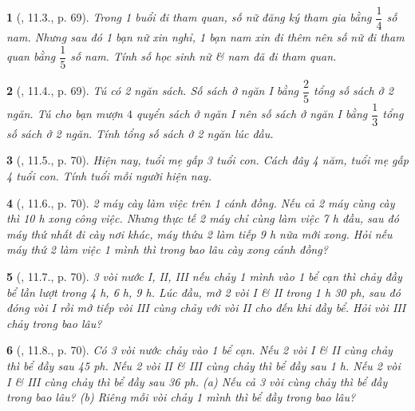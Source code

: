 \documentclass{article}
\newtheorem{baitoan}{}
\begin{document}
\begin{baitoan}[\cite{TLCT_THCS_Toan_6_so_hoc}, 11.3., p. 69]
	Trong 1 buổi đi tham quan, số nữ đăng ký tham gia bằng $\dfrac{1}{4}$ số nam. Nhưng sau đó 1 bạn nữ xin nghỉ, 1 bạn nam xin đi thêm nên số nữ đi tham quan bằng $\dfrac{1}{5}$ số nam. Tính số học sinh nữ \& nam đã đi tham quan.
\end{baitoan}

\begin{baitoan}[\cite{TLCT_THCS_Toan_6_so_hoc}, 11.4., p. 69]
	Tú có 2 ngăn sách. Số sách ở ngăn I bằng $\dfrac{2}{5}$ tổng số sách ở 2 ngăn. Tú cho bạn mượn $4$ quyển sách ở ngăn I nên số sách ở ngăn I bằng $\dfrac{1}{3}$ tổng số sách ở 2 ngăn. Tính tổng số sách ở 2 ngăn lúc đầu.
\end{baitoan}

\begin{baitoan}[\cite{TLCT_THCS_Toan_6_so_hoc}, 11.5., p. 70]
	Hiện nay, tuổi mẹ gấp 3 tuổi con. Cách đây 4 năm, tuổi mẹ gấp 4 tuổi con. Tính tuổi mỗi người hiện nay.
\end{baitoan}

\begin{baitoan}[\cite{TLCT_THCS_Toan_6_so_hoc}, 11.6., p. 70]
	2 máy cày làm việc trên 1 cánh đồng. Nếu cả 2 máy cùng cày thì {\rm10 h} xong công việc. Nhưng thực tế 2 máy chỉ cùng làm việc {\rm7 h} đầu, sau đó máy thứ nhất đi cày nơi khác, máy thứu 2 làm tiếp {\rm9 h} nữa mới xong. Hỏi nếu máy thứ 2 làm việc 1 mình thì trong bao lâu cày xong cánh đồng?
\end{baitoan}

\begin{baitoan}[\cite{TLCT_THCS_Toan_6_so_hoc}, 11.7., p. 70]
	3 vòi nước I, II, III nếu chảy 1 mình vào 1 bể cạn thì chảy đầy bể lần lượt trong {\rm4 h, 6 h, 9 h}. Lúc đầu, mở 2 vòi I \& II trong {\rm1 h 30 ph}, sau đó đóng vòi I rồi mở tiếp vòi III cùng chảy với vòi II cho đến khi đầy bể. Hỏi vòi III chảy trong bao lâu?
\end{baitoan}

\begin{baitoan}[\cite{TLCT_THCS_Toan_6_so_hoc}, 11.8., p. 70]
	Có 3 vòi nước chảy vào 1 bể cạn. Nếu 2 vòi I \& II cùng chảy thì bể đầy sau {\rm45 ph}. Nếu 2 vòi II \& III cùng chảy thì bể đầy sau {\rm1 h}. Nếu 2 vòi I \& III cùng chảy thì bể đầy sau {\rm36 ph}. (a) Nếu cả 3 vòi cùng chảy thì bể đầy trong bao lâu? (b) Riêng mỗi vòi chảy 1 mình thì bể đầy trong bao lâu?
\end{baitoan}
\end{document}
